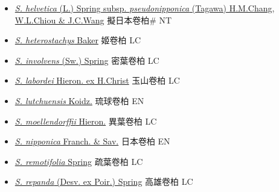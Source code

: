 \begin{itemize}
\begin{itemize}
        \item[] \href{http://www.theplantlist.org/tpl1.1/search?q=Selaginella+helvetica+subsp.+pseudonipponica}{\textit{S. helvetica} (L.) Spring subsp. \textit{pseudonipponica} (Tagawa) H.M.Chang, W.L.Chiou \& J.C.Wang}     擬日本卷柏\# NT
        \item[] \href{http://www.theplantlist.org/tpl1.1/search?q=Selaginella+heterostachys}{\textit{S. heterostachys} Baker}   姬卷柏 LC
        \item[] \href{http://www.theplantlist.org/tpl1.1/search?q=Selaginella+involvens}{\textit{S. involvens} (Sw.) Spring}   密葉卷柏 LC
        \item[] \href{http://www.theplantlist.org/tpl1.1/search?q=Selaginella+labordei}{\textit{S. labordei} Hieron. ex H.Christ}   玉山卷柏 LC
        \item[] \href{http://www.theplantlist.org/tpl1.1/search?q=Selaginella+lutchuensis}{\textit{S. lutchuensis} Koidz.}   琉球卷柏 EN
        \item[] \href{http://www.theplantlist.org/tpl1.1/search?q=Selaginella+moellendorffii}{\textit{S. moellendorffii} Hieron.}   異葉卷柏 LC
        \item[] \href{http://www.theplantlist.org/tpl1.1/search?q=Selaginella+nipponica}{\textit{S. nipponica} Franch. \& Sav.}   日本卷柏 EN
        \item[] \href{http://www.theplantlist.org/tpl1.1/search?q=Selaginella+remotifolia}{\textit{S. remotifolia} Spring}   疏葉卷柏 LC
        \item[] \href{http://www.theplantlist.org/tpl1.1/search?q=Selaginella+repanda}{\textit{S. repanda} (Desv. ex Poir.) Spring}   高雄卷柏 LC

\end{itemize}
\end{itemize}
